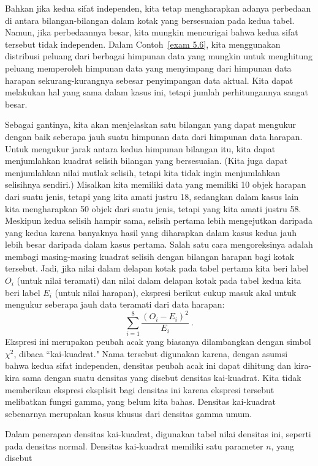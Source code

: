 \begin{example}
Bahkan jika kedua sifat independen, kita tetap mengharapkan adanya perbedaan di antara
bilangan-bilangan dalam kotak yang bersesuaian pada kedua tabel.  Namun, jika
perbedaannya besar, kita mungkin mencurigai bahwa kedua sifat tersebut tidak
independen.  Dalam Contoh~\ref{exam 5.6}, kita menggunakan distribusi peluang dari
berbagai himpunan data yang mungkin untuk menghitung peluang memperoleh himpunan data
yang menyimpang dari himpunan data harapan sekurang-kurangnya sebesar penyimpangan
data aktual.  Kita dapat melakukan hal yang sama dalam kasus ini, tetapi jumlah
perhitungannya sangat besar.
\par
Sebagai gantinya, kita akan menjelaskan satu bilangan yang dapat mengukur dengan baik
seberapa jauh suatu himpunan data dari himpunan data harapan.  Untuk mengukur jarak
antara kedua himpunan bilangan itu, kita dapat menjumlahkan kuadrat selisih bilangan
yang bersesuaian.  (Kita juga dapat menjumlahkan nilai mutlak selisih, tetapi kita
tidak ingin menjumlahkan selisihnya sendiri.)  Misalkan kita memiliki data yang
memiliki 10 objek harapan dari suatu jenis, tetapi yang kita amati justru 18,
sedangkan dalam kasus lain kita mengharapkan 50 objek dari suatu jenis, tetapi yang
kita amati justru 58.  Meskipun kedua selisih hampir sama, selisih pertama lebih
mengejutkan daripada yang kedua karena banyaknya hasil yang diharapkan dalam kasus
kedua jauh lebih besar daripada dalam kasus pertama.  Salah satu cara mengoreksinya
adalah membagi masing-masing kuadrat selisih dengan bilangan harapan bagi kotak
tersebut.  Jadi, jika nilai dalam delapan kotak pada tabel pertama kita beri label
$O_i$ (untuk nilai teramati) dan nilai dalam delapan kotak pada tabel kedua kita beri
label $E_i$ (untuk nilai harapan), ekspresi berikut cukup masuk akal untuk mengukur
seberapa jauh data teramati dari data harapan:
$$\sum_{i = 1}^8 \frac{(O_i - E_i)^2}{E_i}\ .$$
Ekspresi ini merupakan peubah acak yang biasanya dilambangkan dengan simbol $\chi^2$,
dibaca ``kai-kuadrat."  Nama tersebut digunakan karena, dengan asumsi bahwa kedua
sifat independen, densitas peubah acak ini dapat dihitung dan kira-kira sama dengan
suatu densitas yang disebut densitas kai-kuadrat.  Kita tidak memberikan ekspresi
eksplisit bagi densitas ini karena ekspresi tersebut melibatkan fungsi gamma, yang
belum kita bahas.  Densitas kai-kuadrat sebenarnya merupakan kasus khusus dari
densitas gamma umum.
\par
Dalam penerapan densitas kai-kuadrat, digunakan tabel nilai densitas ini, seperti pada
densitas normal.  Densitas kai-kuadrat memiliki satu parameter $n$, yang disebut

\end{example}
